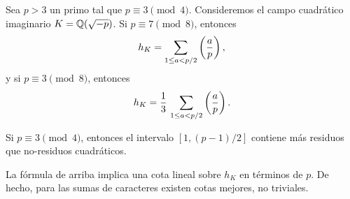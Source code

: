 \begin{teorema}[Dirichlet]
  Sea $p > 3$ un primo tal que $p \equiv 3 \pmod{4}$. Consideremos el campo
  cuadrático imaginario $K = \mathbb{Q} (\sqrt{-p})$. Si $p \equiv 7 \pmod{8}$,
  entonces
  $$h_K = \sum_{1 \le a < p/2} \left(\frac{a}{p}\right),$$
  y si $p \equiv 3 \pmod{8}$, entonces
  $$h_K = \frac{1}{3}\,\sum_{1 \le a < p/2} \left(\frac{a}{p}\right).$$
\end{teorema}

\begin{corolario}
  Si $p \equiv 3 \pmod{4}$, entonces el intervalo $[1, (p-1)/2]$ contiene más
  residuos que no-residuos cuadráticos.
\end{corolario}

La fórmula de arriba implica una cota lineal sobre $h_K$ en términos de $p$.
De hecho, para las sumas de caracteres existen cotas mejores, no triviales.

